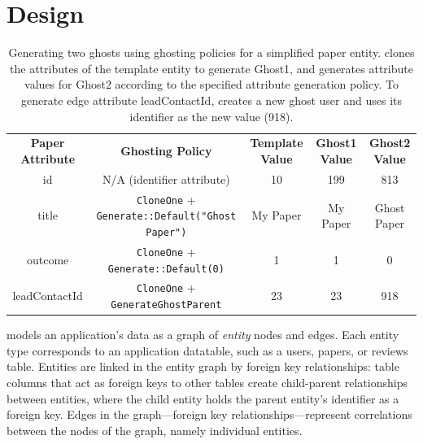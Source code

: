 \section{Design}
\begin{table}[t!]
    \centering
    \footnotesize
\begin{tabular}{@{}ccccc@{}}
\textbf{Paper Attribute} & \textbf{Ghosting Policy} & \textbf{Template Value} & \textbf{Ghost1 Value} & \textbf{Ghost2 Value} 
  \\ \cmidrule(r){1-5}
    {id} & N/A (identifier attribute) & 10 & 199 & 813 \\
{title} & \texttt{CloneOne} + \texttt{Generate::Default("Ghost Paper")} & My Paper & My
    Paper & Ghost Paper \\
{outcome} & \texttt{CloneOne} + \texttt{Generate::Default(0)} & 1 & 1 & 0 \\
{leadContactId} & \texttt{CloneOne} + \texttt{GenerateGhostParent} & 23 & 23 & 918 \\
\end{tabular}
    \caption{Generating two ghosts using ghosting policies for a simplified paper entity.
    \sys clones the attributes of the template entity to generate Ghost1, and generates
    attribute values for Ghost2 according to the specified attribute generation policy. To generate edge attribute leadContactId, \sys creates a new ghost user and uses its identifier as the new value (918).}
    \label{tab:ghosting}
\end{table}

\sys models an application's data as a graph of \emph{entity} nodes and edges.  Each entity type
corresponds to an application datatable, such as a users, papers, or reviews table.  Entities are
linked in the entity graph by foreign key relationships: table columns that act as foreign keys to
other tables create child-parent relationships between entities, where the child entity holds the
parent entity's identifier as a foreign key. 
Edges in the graph---foreign key relationships---represent correlations between the nodes of the
graph, namely individual entities.

